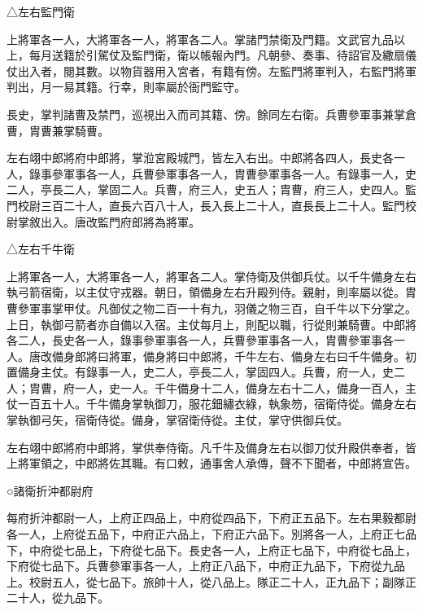 \begin{pinyinscope}
 △左右監門衛



 上將軍各一人，大將軍各一人，將軍各二人。掌諸門禁衛及門籍。文武官九品以上，每月送籍於引駕仗及監門衛，衛以帳報內門。凡朝參、奏事、待詔官及繖扇儀仗出入者，閱其數。以物貨器用入宮者，有籍有傍。左監門將軍判入，右監門將軍判出，月一易其籍。行幸，則率屬於衙門監守。



 長史，掌判諸曹及禁門，巡視出入而司其籍、傍。餘同左右衛。兵曹參軍事兼掌倉曹，胄曹兼掌騎曹。



 左右翊中郎將府中郎將，掌涖宮殿城門，皆左入右出。中郎將各四人，長史各一人，錄事參軍事各一人，兵曹參軍事各一人，胄曹參軍事各一人。有錄事一人，史二人，亭長二人，掌固二人。兵曹，府三人，史五人；胄曹，府三人，史四人。監門校尉三百二十人，直長六百八十人，長入長上二十人，直長長上二十人。監門校尉掌敘出入。唐改監門府郎將為將軍。



 △左右千牛衛



 上將軍各一人，大將軍各一人，將軍各二人。掌侍衛及供御兵仗。以千牛備身左右執弓箭宿衛，以主仗守戎器。朝日，領備身左右升殿列侍。親射，則率屬以從。胄曹參軍事掌甲仗。凡御仗之物二百一十有九，羽儀之物三百，自千牛以下分掌之。上日，執御弓箭者亦自備以入宿。主仗每月上，則配以職，行從則兼騎曹。中郎將各二人，長史各一人，錄事參軍事各一人，兵曹參軍事各一人，胄曹參軍事各一人。唐改備身郎將曰將軍，備身將曰中郎將，千牛左右、備身左右曰千牛備身。初置備身主仗。有錄事一人，史二人，亭長二人，掌固四人。兵曹，府一人，史二人；胄曹，府一人，史一人。千牛備身十二人，備身左右十二人，備身一百人，主仗一百五十人。千牛備身掌執御刀，服花鈿繡衣綠，執象笏，宿衛侍從。備身左右掌執御弓矢，宿衛侍從。備身，掌宿衛侍從。主仗，掌守供御兵仗。



 左右翊中郎將府中郎將，掌供奉侍衛。凡千牛及備身左右以御刀仗升殿供奉者，皆上將軍領之，中郎將佐其職。有口敕，通事舍人承傳，聲不下聞者，中郎將宣告。



 ○諸衛折沖都尉府



 每府折沖都尉一人，上府正四品上，中府從四品下，下府正五品下。左右果毅都尉各一人，上府從五品下，中府正六品上，下府正六品下。別將各一人，上府正七品下，中府從七品上，下府從七品下。長史各一人，上府正七品下，中府從七品上，下府從七品下。兵曹參軍事各一人，上府正八品下，中府正九品下，下府從九品上。校尉五人，從七品下。旅帥十人，從八品上。隊正二十人，正九品下；副隊正二十人，從九品下。




\end{pinyinscope}
